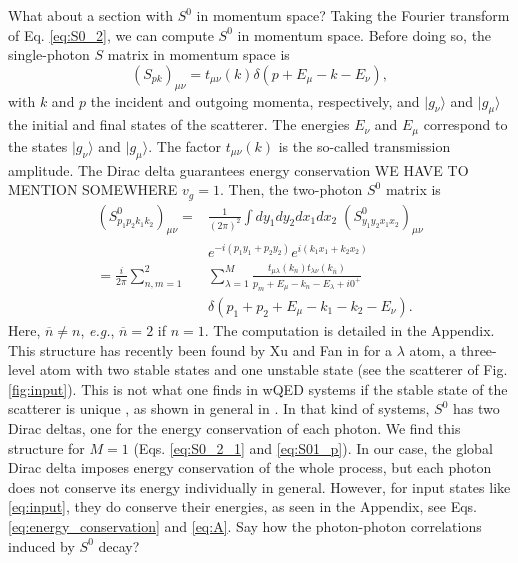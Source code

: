 \documentclass[notitlepage, prx, preprint, amsmath,superscriptaddress,amssymb]{revtex4-1}
\begin{document}
{\color{blue}What about a section with $S^0$ in momentum space?} Taking the Fourier transform of Eq. \eqref{eq:S0_2}, we can compute $S^0$ in momentum space. Before doing so, the single-photon $S$ matrix in momentum space is
\begin{equation}\label{eq:S01_p}
(S_{pk})_{\mu\nu}=t_{\mu\nu}(k)\delta(p+E_\mu-k-E_\nu),
\end{equation}
with $k$ and $p$ the incident and outgoing momenta, respectively, and $|g_\nu\rangle$ and $|g_\mu\rangle$ the initial and final states of the scatterer. The energies $E_\nu$ and $E_\mu$ correspond to the states $|g_\nu\rangle$ and $|g_\mu\rangle$. The factor $t_{\mu\nu}(k)$ is the so-called transmission amplitude. The Dirac delta guarantees energy conservation {\color{blue}WE HAVE TO MENTION SOMEWHERE $v_g=1$}. Then, the two-photon $S^0$ matrix is
\begin{align}\label{eq:S0_2p}
(S_{p_1p_2k_1k_2}^0)_{\mu\nu}=&\frac{1}{(2\pi)^2}\int  dy_1dy_2dx_1dx_2\; (S_{y_1y_2x_1x_2}^0)_{\mu\nu}\nonumber\\
& e^{-i(p_1y_1+p_2y_2)}  e^{i(k_1x_1+k_2x_2)} \nonumber\\
=  \frac{i}{2\pi}\sum_{n,m=1}^2 &\sum_{\lambda=1}^M  \frac{t_{\mu\lambda}(k_n) t_{\lambda\nu}(k_{\overline{n}})}{p_m+E_\mu -k_n -E_\lambda + i0^+}\nonumber\\
&\delta(p_1+p_2+E_\mu - k_1-k_2-E_\nu).
\end{align}
Here, $\overline{n}\neq n$, \emph{e.g.}, $\overline{n}=2$ if $n=1$. The computation is detailed in the Appendix. This structure has recently been found by Xu and Fan in \cite{Xu2016} for a $\lambda$ atom, a three-level atom with two stable states and one unstable state (see the scatterer of Fig. \ref{fig:input}). This is not what one finds in wQED systems if the stable state of the scatterer is unique \cite{Fan2010,Rephaeli2011,Sanchez-Burillo2016b}, as shown in general in \cite{Xu2013}. In that kind of systems, $S^0$ has two Dirac deltas, one for the energy conservation of each photon. We find this structure for $M=1$ (Eqs. \eqref{eq:S0_2_1} and \eqref{eq:S01_p}). In our case, the global Dirac delta imposes energy conservation of the whole process, but each photon does not conserve its energy individually in general. However, for input states like \eqref{eq:input}, they do conserve their energies, as seen in the Appendix, see Eqs. \eqref{eq:energy_conservation} and \eqref{eq:A}. {\color{blue}Say how the photon-photon correlations induced by $S^0$ decay?} %
\end{document}
